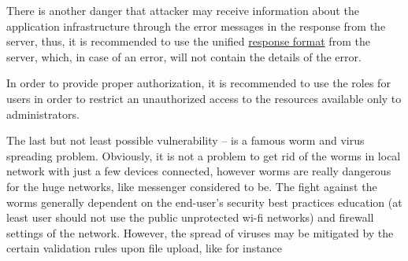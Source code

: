 There is another danger that attacker may receive information about the application infrastructure through the error messages in the
response from the server, thus, it is recommended to use the unified \href{https://datatracker.ietf.org/doc/html/rfc7231}{response format}
from the server, which, in case of an error, will not contain the details of the error.

In order to provide proper authorization, it is recommended to use the roles for users in order to restrict an unauthorized
access to the resources available only to administrators.

The last but not least possible vulnerability -- is a famous worm and virus spreading problem.
Obviously, it is not a problem to get rid of the worms in local network with just a few devices connected,
however worms are really dangerous for the huge networks, like messenger considered to be.
The fight against the worms generally dependent on the end-user's security best practices education (at least user should
not use the public unprotected wi-fi networks) and firewall settings of the network.
However, the spread of viruses may be mitigated by the certain validation rules upon file upload, like for instance


